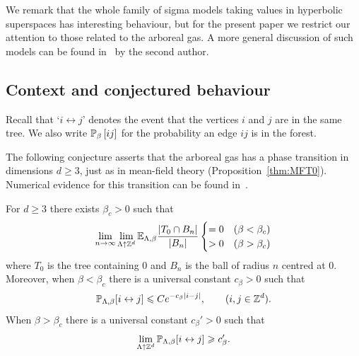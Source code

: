 \documentclass[11pt]{amsart}
\numberwithin{equation}{section}
\numberwithin{theorem}{section}
\newcommand{\cb}[1]{\left[#1\right ]} %
\begin{document}
We remark that the whole family of sigma models taking values in
hyperbolic superspaces has interesting behaviour,
but for the present
paper we restrict our attention to those related to the arboreal gas.
A more general discussion of such models can be found in~\cite{1912.05817}
by the second author.

 
\subsection{Context and conjectured behaviour}
\label{sec:intro-conj}

Recall that `$i\leftrightarrow j$' denotes the event that the vertices $i$ and
$j$ are in the same tree. We also write $\P_{\beta}\cb{ij}$ for the
probability an edge $ij$ is in the forest.

The following conjecture asserts that the
arboreal gas has a phase transition in dimensions $d\geq 3$, just as in 
mean-field theory (Proposition~\ref{thm:MFT0}).  
Numerical
evidence for this transition can be found in~\cite{PhysRevLett.98.030602}.

\begin{conjecture}
  \label{con:transition}
  For $d\geq 3$ there exists $\beta_c > 0$ such that
  \begin{equation} \label{eq:3d}
    \lim_{n\to\infty } \lim_{\Lambda\uparrow \mathbb{Z}^{d}} \mathbb{E}_{\Lambda,\beta}\frac{|T_0\cap B_{n}|}{|B_{n}|}
    \begin{cases}
      = 0 & (\beta < \beta_c)\\
      > 0 & (\beta > \beta_c)
    \end{cases}
  \end{equation}
where $T_0$ is the tree containing $0$ and $B_{n}$ is the
  ball of radius $n$ centred at $0$. 
Moreover, when $\beta<\beta_c$ there is a universal constant $c_\beta>0$ such that
  \begin{equation}
    \mathbb{P}_{\Lambda,\beta}[i\leftrightarrow j] \leqslant Ce^{-c_\beta|i-j|}, \qquad (i,j\in\mathbb{Z}^d).
  \end{equation}
  When $\beta > \beta_c$ there is a universal constant
    $c_{\beta}'> 0$ such that 
  \begin{equation}
    \label{eq:c-sup}
    \lim_{\Lambda\uparrow \mathbb{Z}^{d}}\mathbb{P}_{\Lambda,\beta}[i\leftrightarrow j] \geqslant c_\beta'. 
  \end{equation}
\end{conjecture}
\end{document}
